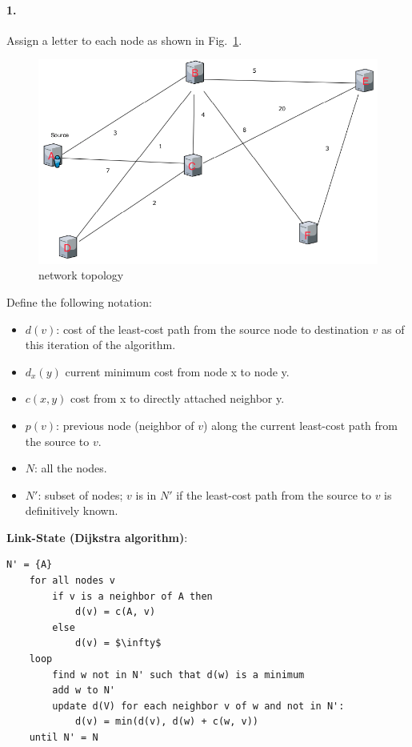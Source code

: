 \documentclass{article}
\begin{document}
\paragraph{1.} Assign a letter to each node as shown in Fig.~\ref{fig:topo}.
\begin{figure}
    \centering
    \includegraphics[width=\linewidth]{fig/topo.png}
    \caption{network topology
    } \label{fig:topo}
\end{figure}
Define the following notation:

\begin{itemize}
    \item $d(v)$: cost of the least-cost path from the source node to destination $v$ as of this iteration of the algorithm.
    \item $d_x(y)$ current minimum cost from node x to node y.
    \item $c(x, y)$ cost from x to directly attached neighbor y.
    \item $p(v)$: previous node (neighbor of $v$) along the current least-cost path from the source to $v$.
    \item $N$: all the nodes.
    \item $N'$: subset of nodes; $v$ is in $N'$ if the least-cost path from the source to $v$ is definitively known.
\end{itemize}

\textbf{Link-State (Dijkstra algorithm)}: 

\begin{lstlisting}[mathescape=true]
    N' = {A}
    for all nodes v
        if v is a neighbor of A then
            d(v) = c(A, v)
        else 
            d(v) = $\infty$
    loop
        find w not in N' such that d(w) is a minimum
        add w to N'
        update d(V) for each neighbor v of w and not in N':
            d(v) = min(d(v), d(w) + c(w, v))
    until N' = N
\end{lstlisting}
\end{document}
